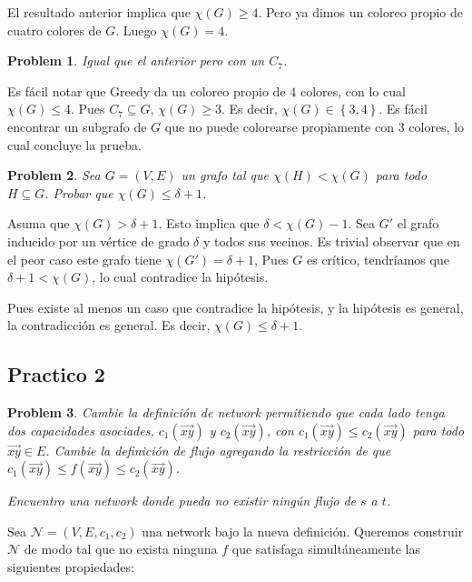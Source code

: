 \documentclass[a4paper, 12pt]{article}
\newtheorem{problem}{Problem}
\newtheorem{problem}{Problem}
\begin{document}
El resultado anterior implica que $\chi(G) \geq 4$. Pero ya dimos un coloreo
propio de cuatro colores de $G$. Luego $\chi(G) = 4$.


\pagebreak 

\begin{problem}
    Igual que el anterior pero con un $C_7$.
\end{problem}

Es fácil notar que Greedy da un coloreo propio de $4$ colores, con lo cual
$\chi(G) \leq 4$. Pues $C_7 \subseteq G$, $\chi(G) \geq 3$. Es decir, $\chi(G)
\in \left\{ 3, 4 \right\} $. Es fácil encontrar un subgrafo de $G$ que no puede
colorearse propiamente con $3$ colores, lo cual concluye la prueba.

\pagebreak 

\begin{problem}
    Sea $G = (V, E) $ un grafo tal que $\chi(H) < \chi(G)$ para todo $H
    \subseteq G$. Probar que $\chi(G) \leq \delta + 1$.
\end{problem}

Asuma que $\chi(G) > \delta + 1$. Esto implica que $\delta < \chi(G) - 1$. Sea
$G'$ el grafo inducido por un vértice de grado $\delta$ y todos sus vecinos. Es
trivial observar que en el peor caso este grafo tiene $\chi(G') = \delta + 1$,
Pues $G$ es crítico, tendríamos que $\delta + 1 < \chi(G)$, lo cual contradice
la hipótesis.

Pues existe al menos un caso que contradice la hipótesis, y la hipótesis es
general, la contradicción es general. Es decir, $\chi(G) \leq \delta + 1$.

\pagebreak
\subsection{Practico 2}

\begin{problem}
    Cambie la definición de network permitiendo que cada lado tenga dos
    capacidades asociades, $c_1(\overrightarrow{xy})$ y
    $c_2(\overrightarrow{xy})$, con $c_1(\overrightarrow{xy}) \leq
    c_2(\overrightarrow{xy})$ para todo $\overrightarrow{xy} \in E$. Cambie la
    definición de flujo agregando la restricción de que
    $c_{1}(\overrightarrow{xy}) \leq f(\overrightarrow{xy}) \leq
    c_2(\overrightarrow{xy})$.

    Encuentro una network donde pueda no existir ningún flujo de $s$ a $t$.
\end{problem}

Sea $\mathcal{N} = (V, E, c_1, c_2)$ una network bajo la nueva definición.
Queremos construir $\mathcal{N}$ de modo tal que no exista ninguna $f$ que
satisfaga simultáneamente las siguientes propiedades: 
\end{document}
